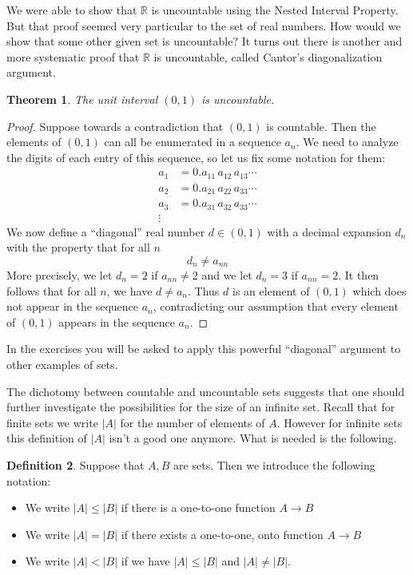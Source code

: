 \documentclass[11pt,oneside]{amsbook}
\newcommand{\RR}{\mathbb R}
\theoremstyle{definition}
\theoremstyle{plain}
\newtheorem{thm}{Theorem}[section]
\theoremstyle{definition}
\newtheorem{defn}[thm]{Definition}
\theoremstyle{remark}
\numberwithin{equation}{section}
\numberwithin{figure}{section}
\begin{document}
We were able to show that $\RR$ is uncountable using the Nested Interval Property. But that proof seemed very particular to the set of real numbers. How would we show that some other given set is uncountable? It turns out there is another and more systematic proof that $\RR$ is uncountable, called Cantor's diagonalization argument.

\begin{thm}
  The unit interval $(0,1)$ is uncountable.
\end{thm}

\begin{proof}
  Suppose towards a contradiction that $(0,1)$ is countable. Then the elements of $(0,1)$ can all be enumerated in a sequence $a_n$. We need to analyze the digits of each entry of this sequence, so let us fix some notation for them:
  \begin{align*}
    a_1&=0.a_{11}\,a_{12}\,a_{13}\cdots\\
    a_2&=0.a_{21}\,a_{22}\,a_{33}\cdots\\
    a_3&=0.a_{31}\,a_{32}\,a_{33}\cdots\\
    \vdots&
  \end{align*}
  We now define a ``diagonal'' real number $d\in(0,1)$ with a decimal expansion $d_n$ with the property that for all $n$
  \[d_n\neq a_{nn}
  \]
  More precisely, we let $d_n=2$ if $a_{nn}\neq2$ and we let $d_n=3$ if $a_{nn}=2$. It then follows that for all $n$, we have $d\neq a_n$. Thus $d$ is an element of $(0,1)$ which does not appear in the sequence $a_n$, contradicting our assumption that every element of $(0,1)$ appears in the sequence $a_n$.
\end{proof}

In the exercises you will be asked to apply this powerful ``diagonal'' argument to other examples of sets.

The dichotomy between countable and uncountable sets suggests that one should further investigate the possibilities for the size of an infinite set. Recall that for finite sets we write $|A|$ for the number of elements of $A$. However for infinite sets this definition of $|A|$ isn't a good one anymore. What is needed is the following.

\begin{defn}
  Suppose that $A,B$ are sets. Then we introduce the following notation:
  \begin{itemize}
  \item We write $|A|\leq|B|$ if there is a one-to-one function $A\to B$
  \item We write $|A|=|B|$ if there exists a one-to-one, onto function $A\to B$
  \item We write $|A|<|B|$ if we have $|A|\leq|B|$ and $|A|\neq|B|$.
  \end{itemize}
\end{defn}
\end{document}
